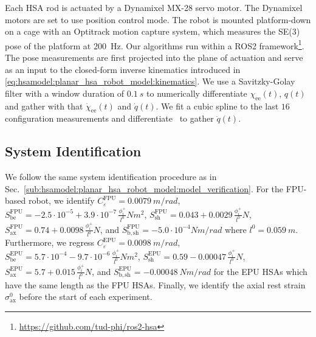 Each \gls{HSA} rod is actuated by a Dynamixel MX-28 servo motor. The Dynamixel motors are set to use position control mode. %
The robot is mounted platform-down on a cage with an Optitrack motion capture system, which measures the SE(3) pose of the platform at \SI{200}{Hz}.
Our algorithms run within a ROS2 framework\footnote{\url{https://github.com/tud-phi/ros2-hsa}}. %
The pose measurements are first projected into the plane of actuation and serve as an input to the closed-form inverse kinematics introduced in \eqref{eq:hsamodel:planar_hsa_robot_model:kinematics}. 
We use a Savitzky-Golay filter with a window duration of $\SI{0.1}{s}$ to numerically differentiate $\chi_\mathrm{ee}(t)$, $q(t)$ and gather with that $\dot{\chi}_\mathrm{ee}(t)$ and $\dot{q}(t)$.
We fit a cubic spline to the last $16$ configuration measurements and differentiate~\citep{kaptanoglu2022pysindy} to gather $\dot{q}(t)$.


\subsection{System Identification}
We follow the same system identification procedure as in Sec.~\ref{sub:hsamodel:planar_hsa_robot_model:model_verification}.
For the FPU-based robot, we identify $C_\varepsilon^\mathrm{FPU}=\SI{0.0079}{m \per rad}$, $S_\mathrm{be}^\mathrm{FPU} = -2.5 \cdot 10^{-5} + 3.9 \cdot 10^{-7} \, \frac{\phi_i^+}{l^0} \si{Nm^2}$, $S_\mathrm{sh}^\mathrm{FPU} = 0.043 + 0.0029 \, \frac{\phi_i^+}{l^0} \si{N}$, $S_\mathrm{ax}^\mathrm{FPU} = 0.74 + 0.0098 \, \frac{\phi_i^+}{l^0} \si{N}$, and $S_\mathrm{b,sh}^\mathrm{FPU} = -5.0 \cdot 10^{-4} \si{Nm \per rad}$ where $l^0 = \SI{0.059}{m}$. 
Furthermore, we regress $C_\varepsilon^\mathrm{EPU}=\SI{0.0098}{m \per rad}$, $S_\mathrm{be}^\mathrm{EPU} = 5.7 \cdot 10^{-4} -9.7 \cdot 10^{-6} \, \frac{\phi_i^+}{l^0} \si{Nm^2}$, $S_\mathrm{sh}^\mathrm{EPU} = 0.59 - 0.00047 \, \frac{\phi_i^+}{l^0} \si{N}$, $S_\mathrm{ax}^\mathrm{EPU} = 5.7 + 0.015 \, \frac{\phi_i^+}{l^0} \si{N}$, and $S_\mathrm{b,sh}^\mathrm{EPU} = -\SI{0.00048}{Nm \per rad}$ for the EPU \glspl{HSA} which have the same length as the FPU \glspl{HSA}.
Finally, we identify the axial rest strain $\sigma_\mathrm{ax}^0$ before the start of each experiment.

